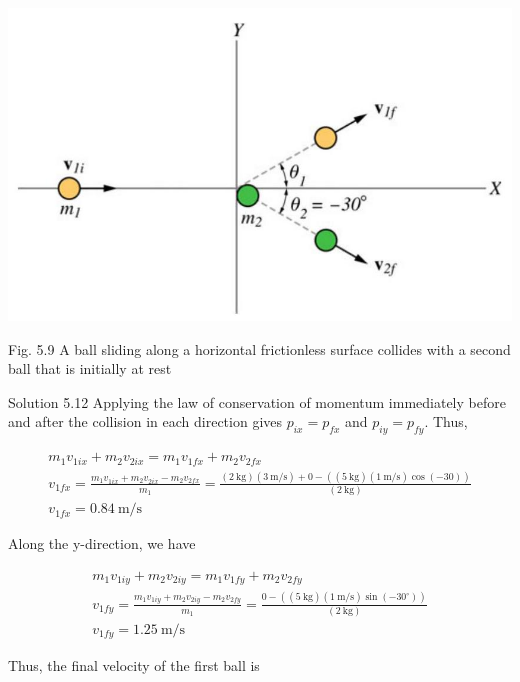 \documentclass[10pt]{article}
\begin{document}
\begin{center}
\includegraphics[max width=\textwidth]{2024_09_13_db1f357d2aad0a03eb2eg-088}
\end{center}

Fig. 5.9 A ball sliding along a horizontal frictionless surface collides with a second ball that is initially at rest

Solution 5.12 Applying the law of conservation of momentum immediately before and after the collision in each direction gives $p_{i x}=p_{f x}$ and $p_{i y}=p_{f y}$. Thus,

$$
\begin{gathered}
m_{1} v_{1 i x}+m_{2} v_{2 i x}=m_{1} v_{1 f x}+m_{2} v_{2 f x} \\
v_{1 f x}=\frac{m_{1} v_{1 i x}+m_{2} v_{2 i x}-m_{2} v_{2 f x}}{m_{1}}=\frac{(2 \mathrm{~kg})(3 \mathrm{~m} / \mathrm{s})+0-((5 \mathrm{~kg})(1 \mathrm{~m} / \mathrm{s}) \cos (-30))}{(2 \mathrm{~kg})} \\
v_{1 f x}=0.84 \mathrm{~m} / \mathrm{s}
\end{gathered}
$$

Along the y-direction, we have

$$
\begin{gathered}
m_{1} v_{1 i y}+m_{2} v_{2 i y}=m_{1} v_{1 f y}+m_{2} v_{2 f y} \\
v_{1 f y}=\frac{m_{1} v_{1 i y}+m_{2} v_{2 i y}-m_{2} v_{2 f y}}{m_{1}}=\frac{0-\left((5 \mathrm{~kg})(1 \mathrm{~m} / \mathrm{s}) \sin \left(-30^{\circ}\right)\right)}{(2 \mathrm{~kg})} \\
v_{1 f y}=1.25 \mathrm{~m} / \mathrm{s}
\end{gathered}
$$

Thus, the final velocity of the first ball is
\end{document}
